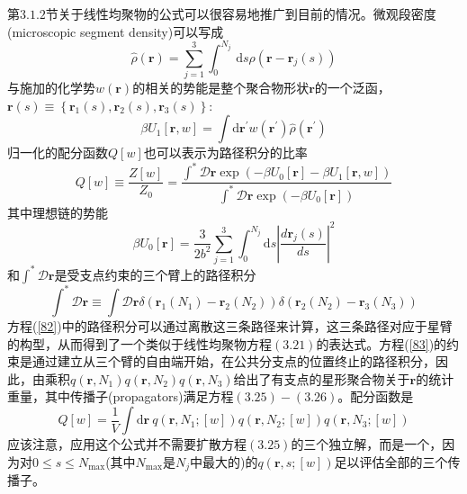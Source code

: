 第$3.1.2$节关于线性均聚物的公式可以很容易地推广到目前的情况。微观段密度(microscopic segment density)可以写成
\begin{equation}
\hat{\rho}(\mathbf{r})=\sum_{j=1}^3 \int_{0}^{N_j}\, \mathrm{d}s\rho(\mathbf{r}-\mathbf{r}_{j}(s))
\end{equation}
与施加的化学势$w (\mathbf{r})$的相关的势能是整个聚合物形状$\mathbf{r}$的一个泛函，$\mathbf{r}(s)\equiv \left\{ \mathbf{r}_1(s),\mathbf{r}_2(s),\mathbf{r}_3(s) \right\}:$
\begin{equation}
\beta U_1[\mathbf{r},w]=\int \mathrm{d}\mathbf{r}^{'}w(\mathbf{r}^{'})\hat{\rho}(\mathbf{r}^{'})
\end{equation}
归一化的配分函数$Q[w]$也可以表示为路径积分的比率
\begin{equation}
Q[w]\equiv \frac{Z[w]}{Z_0}=\frac{\int^{*}\mathcal{D}\mathbf{r}\exp (-\beta U_0[\mathbf{r}]-\beta U_1[\mathbf{r},w])}{\int^{*}\mathcal{D}\mathbf{r}\exp (-\beta U_0[\mathbf{r}])} \label{82}
\end{equation}
其中理想链的势能
\begin{equation}
\beta U_0[\mathbf{r}]=\frac{3}{2b^2}\sum_{j=1}^3\int_{0}^{N_j} \mathrm{d}s\left| \frac{d\mathbf{r}_j(s)}{ds} \right|^2
\end{equation}
和$\int^{*}\mathcal{D}\mathbf{r}$是受支点约束的三个臂上的路径积分
\begin{equation}
\int^{*}\mathcal{D}\mathbf{r}\equiv \int \mathcal{D}\mathbf{r}\delta (\mathbf{r}_1(N_1)-\mathbf{r}_2(N_2))\delta (\mathbf{r}_2(N_2)-\mathbf{r}_3(N_3))  \label{83}
\end{equation}
方程(\ref{82})中的路径积分可以通过离散这三条路径来计算，这三条路径对应于星臂的构型，从而得到了一个类似于线性均聚物方程$(3.21)$的表达式。方程(\ref{83})的约束是通过建立从三个臂的自由端开始，在公共分支点的位置终止的路径积分，因此，由乘积$q(\mathbf{r},N_1)q(\mathbf{r},N_2)q(\mathbf{r},N_3)$给出了有支点的星形聚合物关于$\mathbf{r}$的统计重量，其中传播子(propagators)满足方程$(3.25)-(3.26)$。配分函数是
\begin{equation}
Q[w]=\frac{1}{V}\int \mathrm{d}\mathbf{r}~q(\mathbf{r},N_1;[w])q(\mathbf{r},N_2;[w])q(\mathbf{r},N_3;[w])
\end{equation}
应该注意，应用这个公式并不需要扩散方程$(3.25)$的三个独立解，而是一个，因为对$0\leq s\leq N_{\max}$(其中$N_{\max}$是$N_j$中最大的)的$q(\mathbf{r},s;[w])$足以评估全部的三个传播子。

